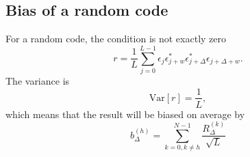 \documentclass[18pt,a4paper]{extarticle}
\begin{document}
\subsection{Bias of a random code}
For a random code, the condition is not exactly zero
\begin{equation}
r = \frac{1}{L}\sum^{L-1}_{j=0}\epsilon_{j}\epsilon_{j+w}^* \epsilon_{j+\Delta}^*\epsilon_{j + \Delta + w}.
\end{equation}
The variance is
\begin{equation}
\mathrm{Var}[r] = \frac{1}{L},
\end{equation}
which means that the result will be biased on average by
\begin{equation}
b^{(h)}_\Delta = \sum_{k=0,k\neq h}^{N-1}\frac{R^{(k)}_\Delta}{\sqrt{L}}
\end{equation}
\end{document}
